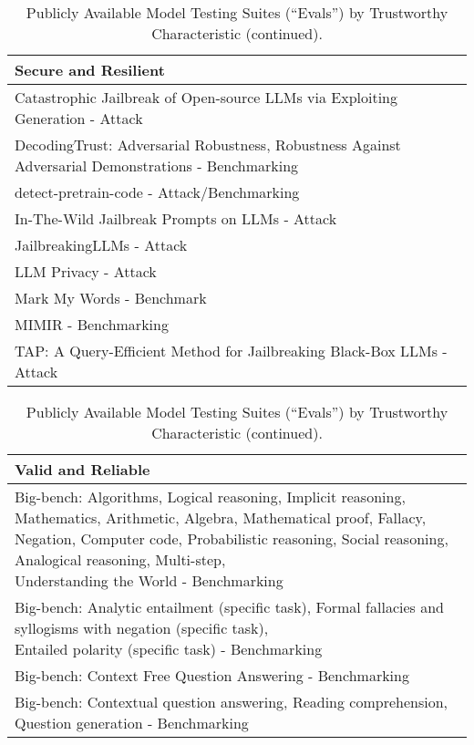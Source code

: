 \documentclass[fleqn]{article}
\begin{document}
\pagebreak 

\begin{table}[H]
	\caption*{Publicly Available Model Testing Suites (``Evals'') by Trustworthy Characteristic (continued).}
	\label{tab:low_risk_measure_by_tc_cont}
	\footnotesize
	\begin{tabular}{l}
		\toprule
		Secure and Resilient \\
		\midrule
		Catastrophic Jailbreak of Open-source LLMs via Exploiting Generation - Attack \\
		DecodingTrust: Adversarial Robustness, Robustness Against Adversarial Demonstrations - Benchmarking \\
		detect-pretrain-code - Attack/Benchmarking \\
		In-The-Wild Jailbreak Prompts on LLMs - Attack \\
		JailbreakingLLMs - Attack \\
		LLM Privacy - Attack \\
		Mark My Words - Benchmark \\
		MIMIR - Benchmarking \\
		TAP: A Query-Efficient Method for Jailbreaking Black-Box LLMs - Attack \\
		\bottomrule
	\end{tabular}
	\newline
	\vspace{10pt}
	\newline		
	\begin{tabular}{l}
		\toprule
		Valid and Reliable \\
		\midrule
		\makecell[l]{Big-bench: Algorithms, Logical reasoning, Implicit reasoning, Mathematics, Arithmetic, Algebra, Mathematical proof, Fallacy,\\\hspace{10pt} Negation, Computer code, Probabilistic reasoning, Social reasoning, Analogical reasoning, Multi-step,\\\hspace{10pt} Understanding the World - Benchmarking} \\
		\makecell[l]{Big-bench: Analytic entailment (specific task), Formal fallacies and syllogisms with negation (specific task),\\\hspace{10pt}Entailed polarity (specific task) - Benchmarking} \\
		Big-bench: Context Free Question Answering - Benchmarking \\
		Big-bench: Contextual question answering, Reading comprehension, Question generation - Benchmarking \\

\end{tabular}
\end{table}
\end{document}
